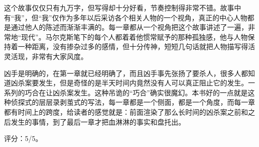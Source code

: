 这个故事仅仅只有九万字，但写得却十分好看，节奏控制得非常不错。故事中有“我”，但“我”仅作为多年以后采访各个相关人物的一个视角，真正的中心人物都是通过他人的陈述而渐渐丰满的。每一章都从一个视角把这个故事讲述了一遍，非常地“现代”。马尔克斯笔下的每个人都着着他惯常赋予的那种孤独感，他与人物保持着一种距离，没有掺杂过多的感情，但十分传神，短短几句话就把人物描写得活灵活现，非常有大家风度。

凶手是明确的，在第一章就已经明确了，而且凶手事先张扬了要杀人，很多人都知道凶杀案要发生，但是奇怪的是半天时间内竟然没有人可以真正阻止它的发生。一系列的巧合在让凶杀案发生。这种吊诡的“巧合”确实很魔幻。本书好的一点就是这种侦探式的层层录剥茧式的写法，每一章都是一个侧面，都是一个角度，而每一章都有时间上的跨度，给读者的感觉就是：前面渲染了那么长时间的凶杀案之前和之后发生的事情，到了最后一章才把血淋淋的事实和盘托出。

评分：5/5。